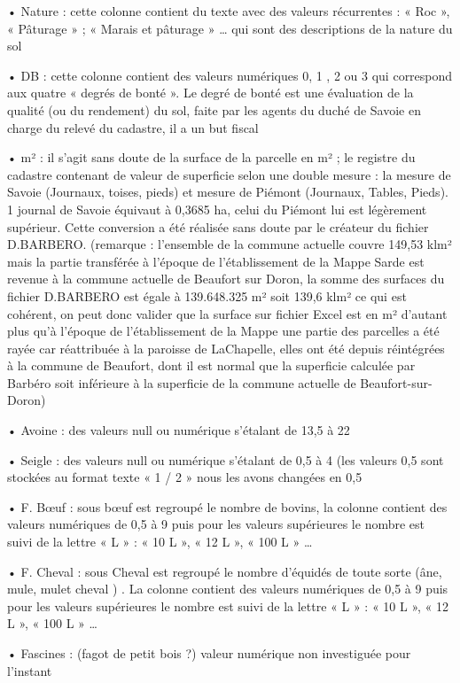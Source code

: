 \documentclass[12pt,a4paper]{report}
\begin{document}
•	Nature : cette colonne contient du texte avec des valeurs récurrentes : « Roc », « Pâturage » ; « Marais et pâturage » … qui sont des descriptions de la nature du sol

•	DB : cette colonne contient des valeurs numériques 0, 1 , 2 ou 3 qui correspond aux quatre « degrés de bonté ». Le degré de bonté est une évaluation de la qualité (ou du rendement) du sol, faite par les agents du duché de Savoie en charge du relevé du cadastre, il a un but fiscal

•	m² : il s’agit sans doute de la surface de la parcelle en m² ; le registre du cadastre contenant de valeur de superficie selon une double mesure : la mesure de Savoie (Journaux, toises, pieds) et mesure de Piémont (Journaux, Tables, Pieds). 1 journal de Savoie équivaut à 0,3685 ha, celui du Piémont lui est légèrement supérieur. Cette conversion a été réalisée sans doute par le créateur du fichier D.BARBERO. (remarque : l’ensemble de la commune actuelle couvre 149,53 klm²  mais la partie transférée à l’époque de l’établissement de la Mappe Sarde est revenue à la commune actuelle de Beaufort sur Doron, la somme des surfaces du fichier D.BARBERO est égale à 139.648.325 m² soit 139,6 klm² ce qui est cohérent, on peut donc valider que la surface sur fichier Excel est en m² d'autant plus qu'à l'époque de l'établissement de la Mappe une partie des parcelles a été rayée car réattribuée à la paroisse de LaChapelle, elles ont été depuis réintégrées à la commune de Beaufort, dont il est normal que la superficie calculée par Barbéro soit inférieure à la superficie de la commune actuelle de Beaufort-sur-Doron) 

•	Avoine : des valeurs null ou numérique s’étalant de 13,5 à 22

•	Seigle : des valeurs null ou numérique s’étalant de 0,5 à 4 (les valeurs 0,5 sont stockées au format texte « 1 / 2 » nous les avons changées en 0,5

•	F. Bœuf : sous bœuf est regroupé le nombre de bovins, la colonne contient des valeurs numériques de 0,5 à 9 puis pour les valeurs supérieures le nombre est suivi de la lettre « L » : « 10 L », « 12 L », « 100 L » …

•	F. Cheval : sous Cheval est regroupé le nombre d’équidés de toute sorte (âne, mule, mulet cheval ) . La colonne contient des valeurs numériques de 0,5 à 9 puis pour les valeurs supérieures le nombre est suivi de la lettre « L » : « 10 L », « 12 L », « 100 L » …

•	Fascines : (fagot de petit bois ?) valeur numérique non investiguée pour l’instant
\end{document}

